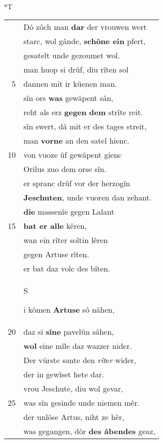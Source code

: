 \documentclass[8pt,a4paper,notitlepage]{article}
\begin{document}
\begin{table}[ht]
\begin{minipage}[t]{0.5\linewidth}
\end{minipage}
\hspace{0.5cm}
\begin{minipage}[t]{0.5\linewidth}
\small
\begin{center}*T
\end{center}
\begin{tabular}{rl}
 & Dô zôch man \textbf{dar} der vrouwen wert\\ 
 & starc, wol gânde, \textbf{schône ein} pfert,\\ 
 & gesatelt unde gezoumet wol.\\ 
 & man huop si drûf, diu rîten sol\\ 
5 & dannen mit ir küenen man.\\ 
 & sîn ors \textbf{was} gewâpent sân,\\ 
 & reht als erz \textbf{gegen} \textbf{dem} strîte reit.\\ 
 & sîn swert, dâ mit er des tages streit,\\ 
 & man \textbf{vorne} an den satel hienc.\\ 
10 & von vuoze ûf gewâpent gienc\\ 
 & Orilus zuo dem orse sîn.\\ 
 & er spranc drûf vor der herzogîn\\ 
 & \textbf{Jeschuten}, unde vuoren dan zehant.\\ 
 & \textbf{die} massenîe gegen Lalant\\ 
15 & \textbf{bat er alle} kêren,\\ 
 & wan ein rîter soltin lêren\\ 
 & gegen Artuse rîten.\\ 
 & er bat daz volc des bîten.\\ 
 & \begin{large}S\end{large}i kômen \textbf{Artuse} sô nâhen,\\ 
20 & daz si \textbf{sîne} pavelûn sâhen,\\ 
 & \textbf{wol} eine mîle daz wazzer nider.\\ 
 & Der vürste sante den \textit{rît}e\textit{r} wider,\\ 
 & der in gewîset hete dar.\\ 
 & vrou Jeschute, diu wol gevar,\\ 
25 & was sîn gesinde unde niemen mêr.\\ 
 & der unlôse Artus, niht ze hêr,\\ 
 & was gegangen, dôr \textbf{des âbendes} geaz,\\ 

\end{tabular}
\end{minipage}
\end{table}
\end{document}

